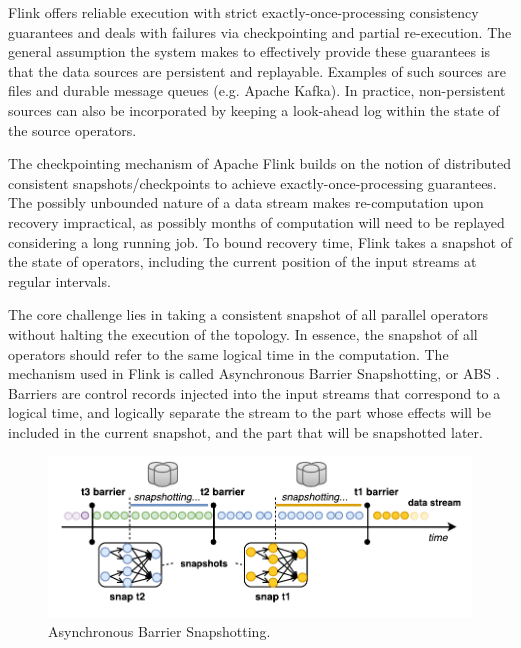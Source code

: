 Flink offers reliable execution with strict exactly-once-processing consistency guarantees and deals with failures via checkpointing and partial re-execution. The general assumption the system makes to effectively provide these guarantees is that the data sources are persistent and replayable. Examples of such sources are files and durable message queues (e.g. Apache Kafka). In practice, non-persistent sources can also be incorporated by keeping a look-ahead log within the state of the source operators.

The checkpointing mechanism of Apache Flink builds on the notion of distributed consistent snapshots/checkpoints to achieve exactly-once-processing guarantees. The possibly unbounded nature of a data stream makes re-computation upon recovery impractical, as possibly months of computation will need to be replayed considering a long running job. To bound recovery time, Flink takes a snapshot of the state of operators, including the current position of the input streams at regular intervals.

The core challenge lies in taking a consistent snapshot of all parallel operators without halting the execution of the topology. In essence, the snapshot of all operators should refer to the same logical time in the computation. The mechanism used in Flink is called Asynchronous Barrier Snapshotting, or ABS \cite{carbone2015lightweight}. Barriers are control records injected into the input streams that correspond to a logical time, and logically separate the stream to the part whose effects will be included in the current snapshot, and the part that will be snapshotted later.

\begin{figure}[t!]
	\centering
  	\includegraphics[width=.75\textwidth]{figs/snaps.pdf}
  	\vspace{-6mm}
	\caption{Asynchronous Barrier Snapshotting.}
	\vspace{-2mm}
	\label{fig:snapshots}
\end{figure}

